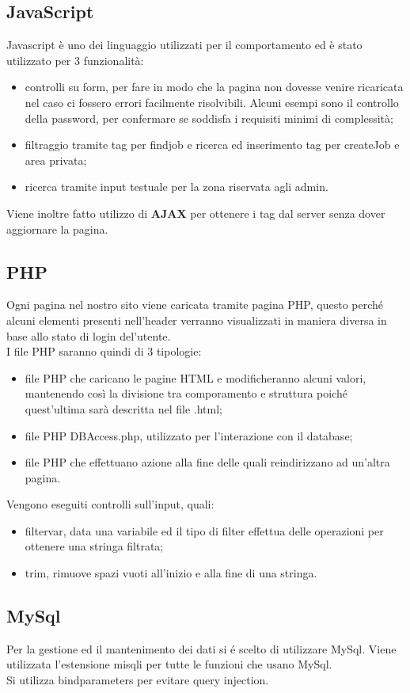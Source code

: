   \subsection{JavaScript}
  Javascript è uno dei linguaggio utilizzati per il comportamento ed è stato utilizzato per 3 funzionalità:
  \begin{itemize}
    \item controlli su form, per fare in modo che la pagina non dovesse venire ricaricata nel caso ci fossero errori facilmente risolvibili. Alcuni esempi sono il controllo della password, per confermare se soddisfa i requisiti minimi di complessità;
    \item filtraggio tramite tag per findjob e ricerca ed inserimento tag per createJob e area privata;
    \item ricerca tramite input testuale per la zona riservata agli admin.
  \end{itemize}
  
  Viene inoltre fatto utilizzo di \textbf{AJAX} per ottenere i tag dal server senza dover aggiornare la pagina.

  \subsection{PHP}
  Ogni pagina nel nostro sito viene caricata tramite pagina PHP, questo perché alcuni elementi presenti nell'header verranno visualizzati in maniera diversa in base allo stato di login del'utente. \\
  I file PHP saranno quindi di 3 tipologie:
  \begin{itemize}
    \item file PHP che caricano le pagine HTML e modificheranno alcuni valori, mantenendo così la divisione tra comporamento e struttura poiché quest'ultima sarà descritta nel file .html;
    \item file PHP DBAccess.php, utilizzato per l'interazione con il database;
    \item file PHP che effettuano azione alla fine delle quali reindirizzano ad un'altra pagina.
  \end{itemize}

  Vengono eseguiti controlli sull'input, quali:
  \begin{itemize}
    \item filter\textunderscore var, data una variabile ed il tipo di filter effettua delle operazioni per ottenere una stringa filtrata;
    \item trim, rimuove spazi vuoti all'inizio e alla fine di una stringa.
  \end{itemize}

  \subsection{MySql}
  Per la gestione ed il mantenimento dei dati si é scelto di utilizzare MySql. Viene utilizzata l'estensione misqli per tutte le funzioni che usano MySql. \\
  Si utilizza bind\textunderscore parameters per evitare query injection.